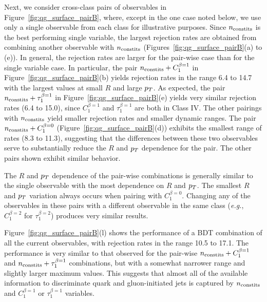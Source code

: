 Next, we consider  cross-class pairs of observables  in Figure~\ref{fig:qg_surface_pairB}, where, except in the one case noted below,
we use only a single observable from each class for illustrative purposes.
Since $n_{\rm constits}$ is the best performing single variable, the largest rejection
rates are obtained from combining another observable with $n_ {\rm constits}$ (Figures~\ref{fig:qg_surface_pairB}(a) to (e)).  
In general, the rejection rates are larger for the pair-wise case
than for the single variable case.  In particular, the pair $n_{\rm constits}+ C_1^{\beta=1}$ in Figure~\ref{fig:qg_surface_pairB}(b)
yields rejection rates in the range 6.4 to 14.7 with the largest
values at small $R$ and large $p_T$.  As expected, the pair  $n_{\rm constits}+ \tau_1^{\beta=1}$ in Figure~\ref{fig:qg_surface_pairB}(e)
yields very similar rejection rates (6.4 to 15.0), since $C_1^{\beta=1}$ and $\tau_1^{\beta=1}$ are both in Class IV. 
The other pairings with $n_{\rm constits}$ yield smaller 
rejection rates and smaller dynamic ranges.  The pair $n_ {\rm constits}+ C_1^{\beta=0}$ (Figure~\ref{fig:qg_surface_pairB}(d)) exhibits
the smallest range of rates (8.3 to 11.3), suggesting that the differences between these two observables serve to substantially 
reduce the $R$ and $p_T$ dependence for the pair.
The other pairs shown exhibit
similar behavior.  

The $R$ and $p_T$ dependence of the pair-wise combinations is generally similar to the single observable with the most dependence 
on $R$ and $p_T$.  The smallest $R$ and $p_T$ variation always occurs 
when pairing with $C_1^{\beta=0}$.  Changing any of the observables in these pairs with a different observable in the same class (\textit{e.g.},
$C_1^{\beta=2}$ for $\tau_1^{\beta=2}$) produces very similar results.  

Figure~\ref{fig:qg_surface_pairB}(l) shows the
performance of a BDT combination of all the current observables,
with rejection rates in the range 10.5 to 17.1.  The performance is
very similar to that observed for the pair-wise $n_{\rm constits}+
C_1^{\beta=1}$ and $n_{\rm constits}+ \tau_1^{\beta=1}$ combinations,
but with a somewhat narrower range and slightly larger maximum
values. This suggests that almost all of the available information to
discriminate quark and gluon-initiated jets is captured by $n_{\rm
  constits}$ and $C_1^{\beta=1}$ or $\tau_1^{\beta=1}$ variables.

